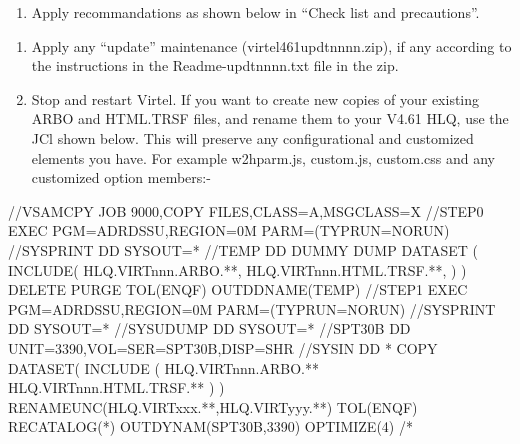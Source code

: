 \documentclass[letterpaper,10pt,english]{sphinxmanual}
\begin{document}
\begin{enumerate}
\def\theenumi{\arabic{enumi}}
\def\labelenumi{\theenumi .}
\makeatletter\def\p@enumii{\p@enumi \theenumi .}\makeatother
\setcounter{enumi}{10}
\item {} 
Apply recommandations as shown below in “Check list and precautions”.

\end{enumerate}

\newpage
\begin{enumerate}
\def\theenumi{\arabic{enumi}}
\def\labelenumi{\theenumi .}
\makeatletter\def\p@enumii{\p@enumi \theenumi .}\makeatother
\setcounter{enumi}{11}
\item {} 
Apply any “update” maintenance (virtel461updtnnnn.zip), if any according to the instructions in the Readme-updtnnnn.txt file in the zip.

\item {} 
Stop and restart Virtel. If you want to create new copies of your existing ARBO and HTML.TRSF files, and rename them to your V4.61 HLQ, use the JCl shown below. This will preserve any configurational and customized elements you have. For example w2hparm.js, custom.js, custom.css and any customized option members:-

\end{enumerate}

\begin{sphinxVerbatim}[commandchars=\\\{\}]
//\PYGZdl{}VSAMCPY JOB 9000,\PYGZsq{}COPY FILES\PYGZsq{},CLASS=A,MSGCLASS=X
//STEP0   EXEC PGM=ADRDSSU,REGION=0M PARM=(\PYGZsq{}TYPRUN=NORUN\PYGZsq{})
//SYSPRINT DD SYSOUT=*
//TEMP DD DUMMY
 DUMP DATASET              \PYGZhy{}
      (                    \PYGZhy{}
       INCLUDE(            \PYGZhy{}
      HLQ.VIRTnnn.ARBO.**, \PYGZhy{}
      HLQ.VIRTnnn.HTML.TRSF.**, \PYGZhy{}
                )         \PYGZhy{}
      )                   \PYGZhy{}
      DELETE    \PYGZhy{}
      PURGE      \PYGZhy{}
      TOL(ENQF) \PYGZhy{}
      OUTDDNAME(TEMP)
//STEP1   EXEC PGM=ADRDSSU,REGION=0M PARM=(\PYGZsq{}TYPRUN=NORUN\PYGZsq{})
//SYSPRINT DD  SYSOUT=*
//SYSUDUMP DD  SYSOUT=*
//SPT30B   DD  UNIT=3390,VOL=SER=SPT30B,DISP=SHR
//SYSIN    DD  *
 COPY                                             \PYGZhy{}
       DATASET(                                   \PYGZhy{}
       INCLUDE (                                  \PYGZhy{}
       HLQ.VIRTnnn.ARBO.**                    \PYGZhy{}
       HLQ.VIRTnnn.HTML.TRSF.**               \PYGZhy{}
  )                                               \PYGZhy{}
  )\PYGZhy{}
  RENAMEUNC(HLQ.VIRTxxx.**,HLQ.VIRTyyy.**) \PYGZhy{}
  TOL(ENQF)   \PYGZhy{}
  RECATALOG(*) \PYGZhy{}
  OUTDYNAM(SPT30B,3390) \PYGZhy{}
  OPTIMIZE(4)
/*
\end{sphinxVerbatim}
\end{document}
